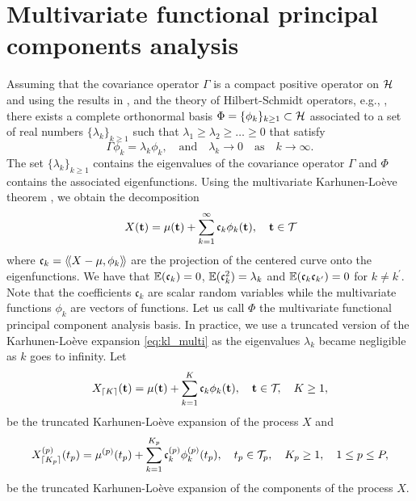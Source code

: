 \section{Multivariate functional principal components analysis} %
\label{sec:functional_principal_components_analysis}

Assuming that the covariance operator $\Gamma$ is a compact positive operator on $\mathcal{H}$ and using the results in \cite{happMultivariateFunctionalPrincipal2015}, and the theory of Hilbert-Schmidt operators, e.g., \cite{reedMethodsModernMathematical1980}, there exists a complete orthonormal basis 
$\Phi = \{\phi_k\}_{k \geq 1} \subset \mathcal{H}$ associated to a set of real numbers $\{\lambda_k\}_{k \geq 1}$ such that $\lambda_1 \geq \lambda_2 \geq \dots \geq 0$ that satisfy
\begin{equation}\label{eq:eigendecomposition}
    \Gamma \phi_k = \lambda_k \phi_k, \quad\text{and}\quad \lambda_k \longrightarrow 0 \quad\text{as}\quad k \longrightarrow \infty.
\end{equation}
The set $\{\lambda_k\}_{k \geq 1}$ contains the eigenvalues of the covariance operator $\Gamma$ and $\Phi$ contains the associated eigenfunctions. Using the multivariate Karhunen-Loève theorem \citep{happMultivariateFunctionalPrincipal2015}, we obtain the decomposition
\begin{equation}\label{eq:kl_multi}
    X(\mathbf{t}) = \mu(\mathbf{t}) + \sum_{k = 1}^\infty \mathfrak{c}_k \phi_k(\mathbf{t}), \quad \mathbf{t} \in \mathcal{T}_{}
\end{equation}
where $\mathfrak{c}_{k} = \langle\!\langle X - \mu, \phi_k\rangle\!\rangle$ are the projection of the centered curve onto the eigenfunctions. We have that $\mathbb{E}(\mathfrak{c}_{k}) = 0$, $\mathbb{E}(\mathfrak{c}_{k}^2) = \lambda_k$ and $\mathbb{E}(\mathfrak{c}_{k}\mathfrak{c}_{k^\prime}) = 0$ for $k \neq k^\prime$. Note that the coefficients $\mathfrak{c}_k$ are scalar random variables while the multivariate functions $\phi_k$ are vectors of functions. Let us call $\Phi$ the multivariate functional principal component analysis basis. In practice, we use a truncated version of the Karhunen-Loève expansion \eqref{eq:kl_multi} as the eigenvalues $\lambda_k$ became negligible as $k$ goes to infinity. Let
\begin{equation}\label{eq:kl_multi_trunc}
    X_{\lceil K \rceil}(\mathbf{t}) = \mu(\mathbf{t}) + \sum_{k = 1}^K \mathfrak{c}_k \phi_k(\mathbf{t}), \quad \mathbf{t} \in \mathcal{T}_{}, \quad K \geq 1,
\end{equation}
be the truncated Karhunen-Loève expansion of the process $X$ and
\begin{equation}\label{eq:kl_multi_trunc_comp}
    X_{\lceil K_p \rceil}^{(p)}(t_p) = \mu^{(p)}(t_p) + \sum_{k = 1}^{K_p} \mathfrak{c}_k^{(p)} \phi_k^{(p)}(t_p), \quad t_p \in \mathcal{T}_{p}, \quad K_p \geq 1, \quad 1 \leq p \leq P,
\end{equation}
be the truncated Karhunen-Loève expansion of the components of the process $X$.


